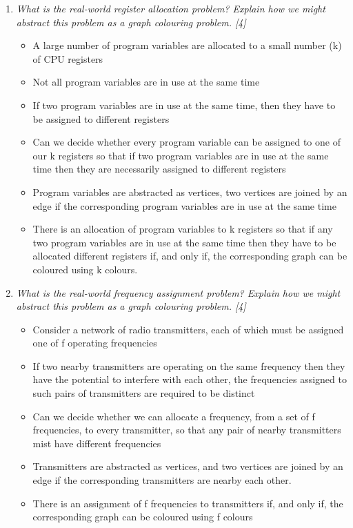 \documentclass{article}[18pt]
\begin{document}
\begin{enumerate}
	\item \textit{What is the real-world register allocation problem? Explain how we might abstract this problem as a graph colouring problem. [4]}
	\begin{itemize}
		\item A large number of program variables are allocated to a small number (k) of CPU registers
		\item Not all program variables are in use at the same time
		\item If two program variables are in use at the same time, then they have to be assigned to different registers
		\item Can we decide whether every program variable can be assigned to one of our k registers so that if two program variables are in use at the same time then they are necessarily assigned to different registers
		\item Program variables are abstracted as vertices, two vertices are joined by an edge if the corresponding program variables are in use at the same time
		\item There is an allocation of program variables to k registers so that if any two program variables are in use at the same time then they have to be allocated different registers if, and only if, the corresponding graph can be coloured using k colours.
	\end{itemize}
	
	\item \textit{What is the real-world frequency assignment problem? Explain how we might abstract this problem as a graph colouring problem. [4]}
	\begin{itemize}
		\item Consider a network of radio transmitters, each of which must be assigned one of f operating frequencies
		\item If two nearby transmitters are operating on the same frequency then they have the potential to interfere with each other, the frequencies assigned to such pairs of transmitters are required to be distinct
		\item Can we decide whether we can allocate a frequency, from a set of f frequencies, to every transmitter, so that any pair of nearby transmitters mist have different frequencies
		\item Transmitters are abstracted as vertices, and two vertices are joined by an edge if the corresponding transmitters are nearby each other.
		\item There is an assignment of f frequencies to transmitters if, and only if, the corresponding graph can be coloured using f colours
	\end{itemize}
	

\end{enumerate}
\end{document}
